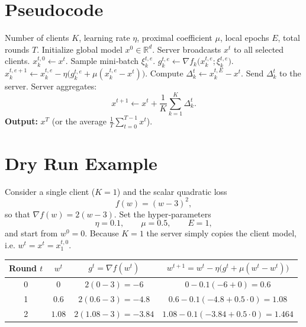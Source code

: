 \documentclass{article}
\begin{document}
\section*{Pseudocode}
\begin{algorithm}[h]
\caption{FedProx with Local SGD}
\begin{algorithmic}[1]
\Require Number of clients $K$, learning rate $\eta$, proximal coefficient $\mu$, local epochs $E$, total rounds $T$.
\State Initialize global model $x^{0}\in\mathbb{R}^{d}$.
    \State Server broadcasts $x^{t}$ to all selected clients.
        \State $x_{k}^{t,0}\gets x^{t}$.
            \State Sample mini‑batch $\xi_{k}^{t,e}$.
            \State $g_{k}^{t,e}\gets \nabla f_k\bigl(x_{k}^{t,e};\xi_{k}^{t,e}\bigr)$.
            \State $x_{k}^{t,e+1}\gets x_{k}^{t,e}
                  -\eta\bigl(g_{k}^{t,e}+\mu(x_{k}^{t,e}-x^{t})\bigr)$.
        \EndFor
        \State Compute $\Delta_{k}^{t}\gets x_{k}^{t,E}-x^{t}$.
        \State Send $\Delta_{k}^{t}$ to the server.
    \EndFor
    \State Server aggregates:
    \[
    x^{t+1}\gets x^{t}+\frac{1}{K}\sum_{k=1}^{K}\Delta_{k}^{t}.
    \]
\EndFor
\State \textbf{Output:} $x^{T}$ (or the average $\frac{1}{T}\sum_{t=0}^{T-1}x^{t}$).
\end{algorithmic}
\end{algorithm}

\section*{Dry Run Example}
Consider a single client ($K=1$) and the scalar quadratic loss
\[
f(w)= (w-3)^{2},
\]
so that $\nabla f(w)=2(w-3)$.  
Set the hyper‑parameters
\[
\eta=0.1,\qquad \mu=0.5,\qquad E=1,
\]
and start from $w^{0}=0$.  Because $K=1$ the server simply copies the client model, i.e. $w^{t}=x^{t}=x_{1}^{t,0}$.

\begin{center}
\begin{tabular}{c|c|c|c}
\textbf{Round $t$} & $w^{t}$ & $g^{t}= \nabla f(w^{t})$ & $w^{t+1}=w^{t}-\eta\bigl(g^{t}+\mu(w^{t}-w^{t})\bigr)$\\\hline
0 & $0$ & $2(0-3)=-6$ & $0-0.1(-6+0)=0.6$\\
1 & $0.6$ & $2(0.6-3)=-4.8$ & $0.6-0.1(-4.8+0.5\cdot0)=1.08$\\
2 & $1.08$ & $2(1.08-3)=-3.84$ & $1.08-0.1(-3.84+0.5\cdot0)=1.464$\\
\end{tabular}
\end{center}
\end{document}

